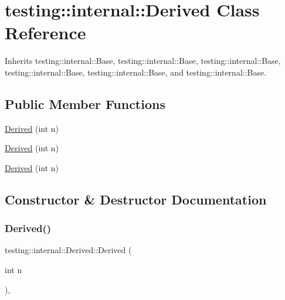 \hypertarget{classtesting_1_1internal_1_1_derived}{}\section{testing\+::internal\+::Derived Class Reference}
\label{classtesting_1_1internal_1_1_derived}


Inherits testing\+::internal\+::\+Base, testing\+::internal\+::\+Base, testing\+::internal\+::\+Base, testing\+::internal\+::\+Base, testing\+::internal\+::\+Base, and testing\+::internal\+::\+Base.

\subsection*{Public Member Functions}
\begin{DoxyCompactItemize}
\item 
\mbox{\hyperlink{classtesting_1_1internal_1_1_derived_a05a8e8354c7c09a9f3728a96c96f1edd}{Derived}} (int n)
\item 
\mbox{\hyperlink{classtesting_1_1internal_1_1_derived_a05a8e8354c7c09a9f3728a96c96f1edd}{Derived}} (int n)
\item 
\mbox{\hyperlink{classtesting_1_1internal_1_1_derived_a05a8e8354c7c09a9f3728a96c96f1edd}{Derived}} (int n)
\end{DoxyCompactItemize}


\subsection{Constructor \& Destructor Documentation}
\mbox{\label{classtesting_1_1internal_1_1_derived_a05a8e8354c7c09a9f3728a96c96f1edd}} 
\subsubsection{\texorpdfstring{Derived()}{Derived()}\hspace{0.1cm}{\footnotesize\ttfamily [1/3]}}
{\footnotesize\ttfamily testing\+::internal\+::\+Derived\+::\+Derived (\begin{DoxyParamCaption}\item[{int}]{n }\end{DoxyParamCaption})\hspace{0.3cm}{\ttfamily [inline]}, {\ttfamily [explicit]}}

